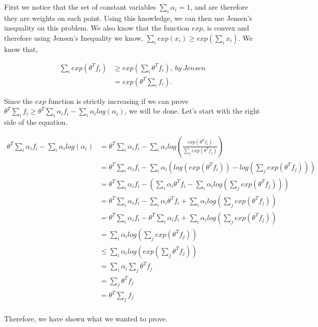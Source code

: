 \documentclass[paper=a4, fontsize=11pt]{scrartcl} %
\begin{document}
First we notice that the set of constant variables $\sum_i \alpha_i = 1$, and are therefore they are weights on each point.
Using this knowledge, we can then use Jensen's inequality on this problem.
We also know that the function $exp$, is convex and therefore using Jensen's Inequality we know, $\sum_i exp(x_i) \ge exp(\sum_ix_i)$.
We know that, 

\begin{align}
\sum_i exp(\theta^Tf_i) &\ge exp(\sum_i \theta^T f_i), \ by\ Jensen \\
&= exp(\theta^T \sum_i  f_i).
\end{align}

Since the $exp$ function is strictly increasing if we can prove $\theta^T \sum_i  f_i \ge \theta^T \sum_i \alpha_if_i - \sum_i \alpha_i log(\alpha_i)$, we will be done.
Let's start with the right side of the equation.

\begin{align}
 \theta^T \sum_i \alpha_if_i - \sum_i \alpha_i log(\alpha_i) &=  \theta^T \sum_i \alpha_if_i - \sum_i \alpha_i log(\frac{exp(\theta^Tf_i)}{\sum_j exp(\theta^Tf_j)}) \\
&=  \theta^T \sum_i \alpha_if_i - \sum_i \alpha_i (log(exp(\theta^Tf_i)) - log(\sum_j exp(\theta^Tf_j))) \\
&= \theta^T \sum_i \alpha_if_i - (\sum_i \alpha_i \theta^T f_i -  \sum_i  \alpha_i  log(\sum_j exp(\theta^Tf_j))) \\
&=  \theta^T \sum_i \alpha_if_i - \sum_i \alpha_i \theta^T f_i + \sum_i  \alpha_i  log(\sum_j exp(\theta^Tf_j)) \\
&=  \theta^T \sum_i \alpha_if_i - \theta^T \sum_i \alpha_i f_i + \sum_i  \alpha_i  log(\sum_j exp(\theta^Tf_j)) \\
& =  \sum_i  \alpha_i  log(\sum_j exp(\theta^Tf_j)) \\
& \le  \sum_i  \alpha_i log(exp(\sum_j \theta^Tf_j)) \\
&= \sum_i \alpha_i \sum_j \theta^T f_j \\
&= \sum_j \theta^T f_j \\
&= \theta^T \sum_j f_j \\
\end{align}

Therefore, we have shown what we wanted to prove.
\end{document}
